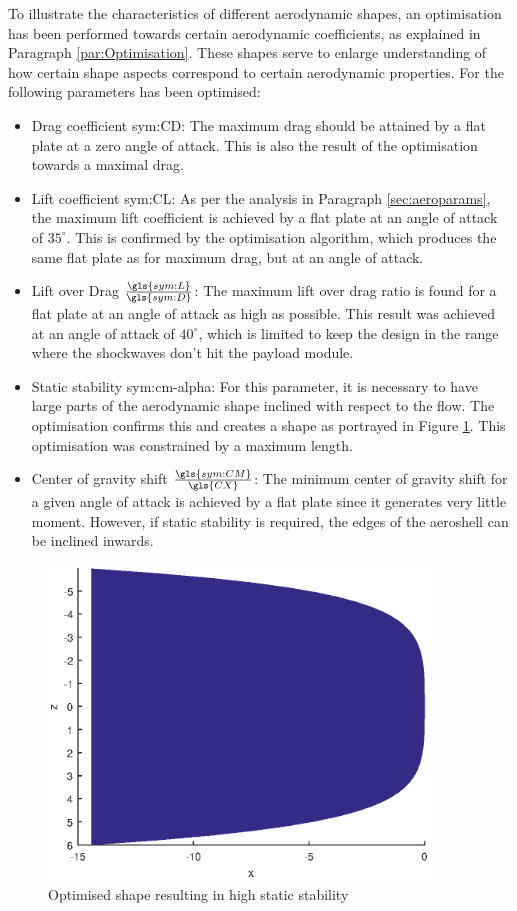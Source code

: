 To illustrate the characteristics of different aerodynamic shapes, an optimisation has been performed towards certain aerodynamic coefficients, as explained in Paragraph \ref{par:Optimisation}. These shapes serve to enlarge understanding of how certain shape aspects correspond to certain aerodynamic properties. For the following parameters has been optimised:
\begin{itemize}
	\item Drag coefficient \gls{sym:CD}: The maximum drag should be attained by a flat plate at a zero angle of attack. This is also the result of the optimisation towards a maximal drag.
	\item Lift coefficient \gls{sym:CL}: As per the analysis in Paragraph \ref{sec:aeroparams}, the maximum lift coefficient is achieved by a flat plate at an angle of attack of $35^\circ$. This is confirmed by the optimisation algorithm, which produces the same flat plate as for maximum drag, but at an angle of attack.
	\item Lift over Drag $\frac{\gls{sym:L}}{\gls{sym:D}}$: The maximum lift over drag ratio is found for a flat plate at an angle of attack as high as possible. This result was achieved at an angle of attack of $40^\circ$, which is limited to keep the design in the range where the shockwaves don't hit the payload module.
	\item Static stability \gls{sym:cm-alpha}: For this parameter, it is necessary to have large parts of the aerodynamic shape inclined with respect to the flow. The optimisation confirms this and creates a shape as portrayed in Figure \ref{fig:highcmalphashape}. This optimisation was constrained by a maximum length.
	\item Center of gravity shift $\frac{\gls{sym:CM}}{\gls{CX}}$: The minimum center of gravity shift for a given angle of attack is achieved by a flat plate since it generates very little moment. However, if static stability is required, the edges of the aeroshell can be inclined inwards.
\end{itemize}


\begin{figure} \label{fig:highcmalphashape}
	\includegraphics[width=0.9\textwidth]{./Figure/Aerodynamics/cmalphamax.eps}
	\caption{Optimised shape resulting in high static stability}
\end{figure}
	

